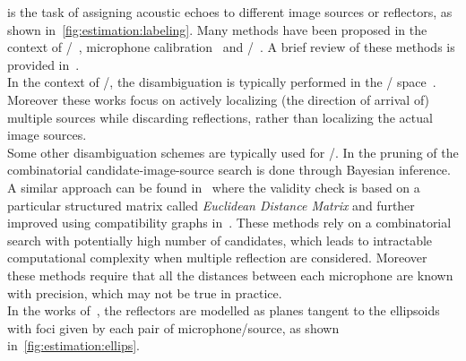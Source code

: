   is the task of assigning acoustic echoes to different image sources or reflectors, as shown in~\cref{fig:estimation:labeling}.
Many methods have been proposed in the context of \SSL/~, microphone calibration~
and \RooGE/~.
A brief review of these methods is provided in~.
\\In the context of \SSL/, the disambiguation is typically performed in the \TDOA/ space~.
Moreover these works focus on actively localizing (the direction of arrival of) multiple sources while discarding reflections, rather than localizing the actual image sources.
\\Some other disambiguation schemes are typically used for \RooGE/.
In  the pruning of the combinatorial candidate-image-source search is done through Bayesian inference.
A similar approach can be found in~ where the validity check is based on a particular structured matrix called \textit{Euclidean Distance Matrix} and further improved using compatibility graphs in~.
These methods rely on a combinatorial search with potentially high number of candidates, which leads to intractable computational complexity when multiple reflection are considered.
Moreover these methods require that all the distances between each microphone are known with precision, which may not be true in practice.
\\In the works of~, the reflectors are modelled as planes tangent to the ellipsoids with foci given by each pair of microphone/source, as shown in~\cref{fig:estimation:ellips}.%
